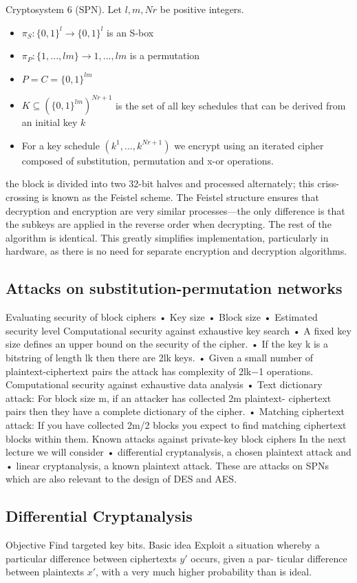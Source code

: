 Cryptosystem 6 (SPN).
Let $l,m,Nr$ be positive integers.
\begin{itemize}
    \item $\pi_S : \{0,1\}^l \rightarrow \{0,1\}^l$ is an S-box
    \item $\pi_P : \{1,...,lm\} \rightarrow {1,...,lm}$ is a permutation
    \item $P=C=\{0,1\}^{lm}$
    \item $K \subseteq (\{0,1\}^{lm})^{Nr+1}$ is the set of all key schedules that can be derived from an initial key $k$
    \item For a key schedule $(k^1,...,k^{Nr+1})$ we encrypt using an iterated cipher composed of substitution, permutation and x-or operations.
\end{itemize}

the block is divided into two 32-bit halves and processed alternately; this criss-crossing is known as the Feistel scheme. The Feistel structure ensures that decryption and encryption are very similar processes—the only difference is that the subkeys are applied in the reverse order when decrypting. The rest of the algorithm is identical. This greatly simplifies implementation, particularly in hardware, as there is no need for separate encryption and decryption algorithms.

\subsection{Attacks on substitution-permutation networks}
Evaluating security of block ciphers
• Key size
• Block size
• Estimated security level
Computational security against exhaustive key search
• A fixed key size defines an upper bound on the security of the cipher.
• If the key k is a bitstring of length lk then there are 2lk keys.
• Given a small number of plaintext-ciphertext pairs the attack has complexity of 2lk−1 operations.
Computational security against exhaustive data analysis
• Text dictionary attack: For block size m, if an attacker has collected 2m plaintext-
ciphertext pairs then they have a complete dictionary of the cipher.
• Matching ciphertext attack: If you have collected 2m/2 blocks you expect to find matching ciphertext blocks within them.
Known attacks against private-key block ciphers
In the next lecture we will consider
• differential cryptanalysis, a chosen plaintext attack and • linear cryptanalysis, a known plaintext attack.
These are attacks on SPNs which are also relevant to the design of DES and AES.
\subsection{Differential Cryptanalysis}
Objective
Find targeted key bits.
Basic idea
Exploit a situation whereby a particular difference between ciphertexts $y\prime$ occurs, given a par- ticular difference between plaintexts $x\prime$, with a very much higher probability than is ideal.
